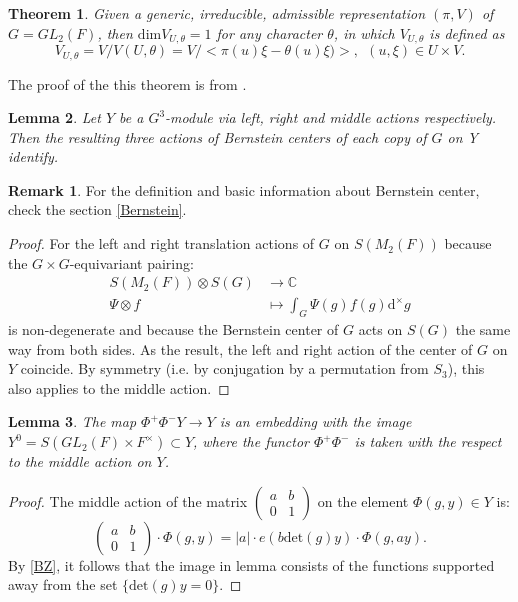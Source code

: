 \documentclass[12pt,a4paper,english]{article}
\theoremstyle{plain}
\newtheorem{thm}{Theorem}[section]
\newtheorem{lem}[thm]{Lemma}
\theoremstyle{definition}
\newtheorem*{rem}{Remark}
\begin{document}
\begin{thm}\label{1dim}
Given a generic, irreducible, admissible representation $(\pi, V)$ of $G=GL_{2}(F)$, then $\text{dim} V_{U,\theta}=1$ for any  character $\theta$, in which $V_{U, \theta}$ is defined as 
\begin{equation*}
    V_{U,\theta}=V/V(U,\theta)=V/<\pi(u)\xi-\theta(u)\xi)>,\ \ (u,\xi)\in U\times V.
\end{equation*}
\end{thm}
The proof of the this theorem is from \cite{bernstein1976representations}.



\begin{lem}
Let $Y$ be a $G^{3}$-module via left, right and middle actions respectively. Then the resulting three actions of Bernstein centers of each copy of $G$ on Y identify.
\end{lem}
\begin{rem}
For the definition and basic information about Bernstein center, check the section \ref{Bernstein}.
\end{rem}
\begin{proof}
For the left and right translation actions of $G$ on $S(M_{2}(F))$ because the $G\times G$-equivariant pairing:
\begin{align*}
    S(M_{2}(F))\otimes S(G)&\rightarrow  \mathbb{C}\\
    \Psi \otimes f &\mapsto \int_{G} \Psi(g)f(g)\text{d}^{\times}g
\end{align*}
is non-degenerate and because the Bernstein center of $G$ acts on $S(G)$ the same way from both sides. As the result, the left and right action of the center of $G$ on $Y$ coincide. By symmetry (i.e. by conjugation by a permutation from $S_{3}$), this also applies to the middle action.
\end{proof}
\begin{lem}
The map $\Phi^{+}\Phi^{-}Y\rightarrow Y$ is an embedding with the image $Y^{0}=S(GL_{2}(F)\times F^{\times})\subset Y$, where the functor $\Phi^{+}\Phi^{-}$ is taken with the respect to the middle action on $Y$.
\end{lem}
\begin{proof}
The middle action of the matrix $\begin{pmatrix}
a &b\\
0&1
\end{pmatrix}$ on the element $\Phi(g, y)\in Y$ is:
\begin{equation*}
\begin{pmatrix}
a &b\\
0&1
\end{pmatrix}\cdot \Phi(g, y)=|a|\cdot e(b\text{det}(g)y)\cdot \Phi(g, ay).
\end{equation*}
By \ref{BZ}, it follows that the image in lemma consists of the functions supported away from the set $\{\text{det}(g)y=0\}$.
\end{proof} 
\end{document}
